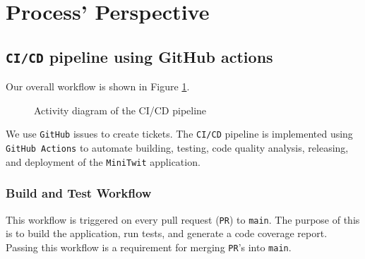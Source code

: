 \section{Process' Perspective}
\label{ch:background} 

\subsection{\texttt{CI/CD} pipeline using GitHub actions}
Our overall workflow is shown in Figure \ref{fig:activity_diagram}.
\begin{figure}[h]
      \centering
      \caption{Activity diagram of the CI/CD pipeline}
      \label{fig:activity_diagram}
\end{figure}

We use \texttt{GitHub} issues to create tickets.
The \texttt{CI/CD} pipeline is implemented using \texttt{GitHub Actions} 
to automate building, testing, code quality analysis, releasing, 
and deployment of the \texttt{MiniTwit} application.

\subsubsection{Build and Test Workflow}
This workflow is triggered on every pull request (\texttt{PR}) to \texttt{main}.
The purpose of this is to build the application, run tests, 
and generate a code coverage report.
Passing this workflow is a requirement for merging 
\texttt{PR}'s into \texttt{main}.

